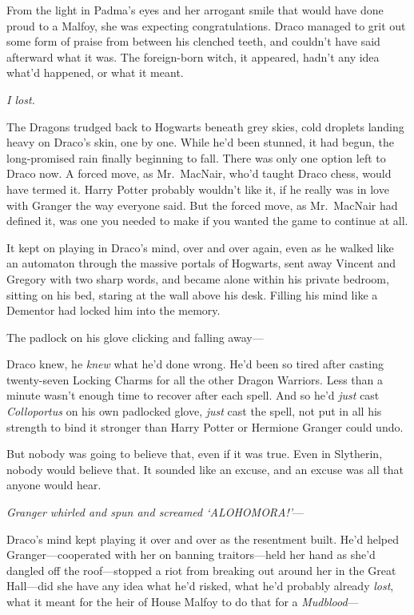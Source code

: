 From the light in Padma's eyes and her arrogant smile that would have done
proud to a Malfoy, she was expecting congratulations. Draco managed to grit out
some form of praise from between his clenched teeth, and couldn't have said
afterward what it was. The foreign-born witch, it appeared, hadn't any idea
what'd happened, or what it meant.

\emph{I lost.}

The Dragons trudged back to Hogwarts beneath grey skies, cold droplets landing
heavy on Draco's skin, one by one. While he'd been stunned, it had begun, the
long-promised rain finally beginning to fall. There was only one option left to
Draco now. A forced move, as Mr.~MacNair, who'd taught Draco chess, would have
termed it. Harry Potter probably wouldn't like it, if he really was in love
with Granger the way everyone said. But the forced move, as Mr.~MacNair had
defined it, was one you needed to make if you wanted the game to continue at
all.

It kept on playing in Draco's mind, over and over again, even as he walked like
an automaton through the massive portals of Hogwarts, sent away Vincent and
Gregory with two sharp words, and became alone within his private bedroom,
sitting on his bed, staring at the wall above his desk. Filling his mind like a
Dementor had locked him into the memory.

The padlock on his glove clicking and falling away---

Draco knew, he \emph{knew} what he'd done wrong. He'd been so tired after
casting twenty-seven Locking Charms for all the other Dragon Warriors. Less
than a minute wasn't enough time to recover after each spell. And so he'd
\emph{just} cast \emph{Colloportus} on his own padlocked glove, \emph{just}
cast the spell, not put in all his strength to bind it stronger than Harry
Potter or Hermione Granger could undo.

But nobody was going to believe that, even if it was true. Even in Slytherin,
nobody would believe that. It sounded like an excuse, and an excuse was all
that anyone would hear.

\emph{Granger whirled and spun and screamed `ALOHOMORA!'}---

Draco's mind kept playing it over and over as the resentment built. He'd helped
Granger---cooperated with her on banning traitors---held her hand as she'd
dangled off the roof---stopped a riot from breaking out around her in the Great
Hall---did she have any idea what he'd risked, what he'd probably already
\emph{lost}, what it meant for the heir of House Malfoy to do that for a
\emph{Mudblood}---

